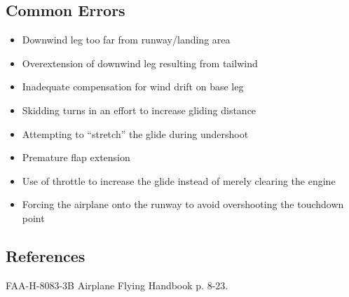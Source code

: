 \subsection{Common Errors}

\begin{itemize}
  \item Downwind leg too far from runway/landing area
  \item Overextension of downwind leg resulting from tailwind
  \item Inadequate compensation for wind drift on base leg
  \item Skidding turns in an effort to increase gliding distance
  \item Attempting to ``stretch'' the glide during undershoot
  \item Premature flap extension
  \item Use of throttle to increase the glide instead of merely clearing the
    engine
  \item Forcing the airplane onto the runway to avoid overshooting the
    touchdown point
\end{itemize}

\subsection{References}

FAA-H-8083-3B Airplane Flying Handbook p. 8-23.
